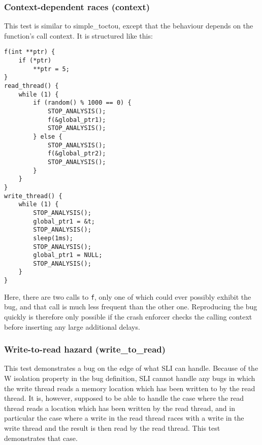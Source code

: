 
\subsubsection{Context-dependent races (context)}

This test is similar to simple\_toctou, except that the behaviour
depends on the function's call context.  It is structured like this:

\begin{verbatim}
f(int **ptr) {
    if (*ptr)
        **ptr = 5;   
}
read_thread() {
    while (1) {
        if (random() % 1000 == 0) {
            STOP_ANALYSIS();
            f(&global_ptr1);
            STOP_ANALYSIS();
        } else {
            STOP_ANALYSIS();
            f(&global_ptr2);
            STOP_ANALYSIS();
        }
    }
}        
write_thread() {
    while (1) {
        STOP_ANALYSIS();
        global_ptr1 = &t;
        STOP_ANALYSIS();
        sleep(1ms);
        STOP_ANALYSIS();
        global_ptr1 = NULL;
        STOP_ANALYSIS();
    }
}
\end{verbatim}

Here, there are two calls to \verb|f|, only one of which could ever
possibly exhibit the bug, and that call is much less frequent than the
other one.  Reproducing the bug quickly is therefore only possible if
the crash enforcer checks the calling context before inserting any
large additional delays.


\subsubsection{Write-to-read hazard (write\_to\_read)}

This test demonstrates a bug on the edge of what SLI can handle.
Because of the W isolation property in the bug definition, SLI cannot
handle any bugs in which the write thread reads a memory location
which has been written to by the read thread.  It is, however,
supposed to be able to handle the case where the read thread reads a
location which has been written by the read thread, and in particular
the case where a write in the read thread races with a write in the
write thread and the result is then read by the read thread.  This
test demonstrates that case.

